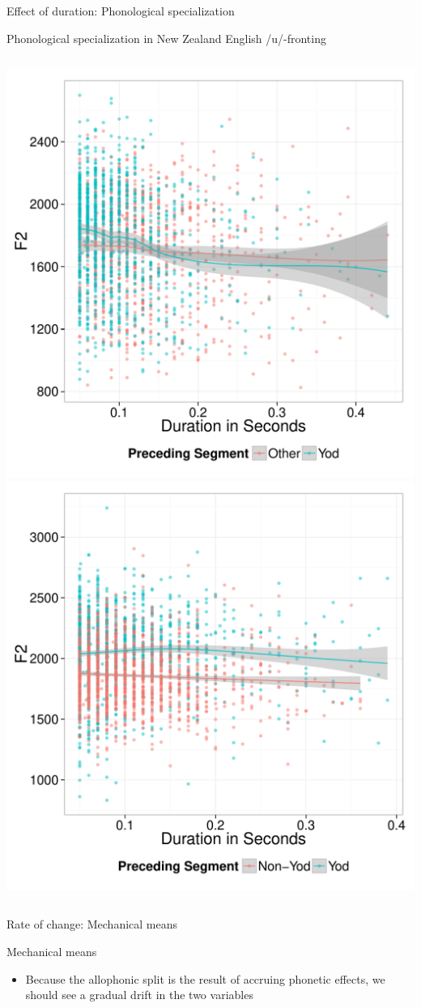 \documentclass[hyperref={pdfpagelabels=false}]{beamer}
\begin{document}
\begin{frame}[noframenumbering]{Effect of duration: Phonological specialization}
	\begin{block}{Phonological specialization in New Zealand English /u/-fronting}
	\begin{columns}[c]
	\includegraphics[trim=2cm 2cm 2cm 2cm, clip=false, width=.7\textwidth]{GooseNewOldDur.pdf}
	\includegraphics[trim=2cm 2cm 2cm 2cm, clip=false, width=.7\textwidth]{GooseNewYoungDur.pdf}
	\end{columns}
	\end{block}	
\end{frame}

\begin{frame}{Rate of change: Mechanical means}
	\begin{block}{Mechanical means}
		\begin{itemize}
			\item Because the allophonic split is the result of accruing phonetic effects, we should see a gradual drift in the two variables
		\end{itemize}
	\end{block}	
\end{frame}
\end{document}

